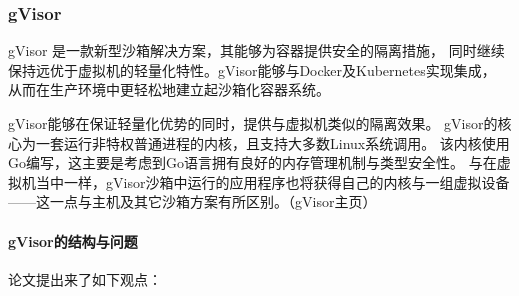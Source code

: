 \documentclass[AutoFakeBold,a4paper]{ctexart}
\begin{document}
\subsubsection{gVisor}
gVisor 是一款新型沙箱解决方案，其能够为容器提供安全的隔离措施，
同时继续保持远优于虚拟机的轻量化特性。gVisor能够与Docker及Kubernetes实现集成，
从而在生产环境中更轻松地建立起沙箱化容器系统。

gVisor能够在保证轻量化优势的同时，提供与虚拟机类似的隔离效果。
gVisor的核心为一套运行非特权普通进程的内核，且支持大多数Linux系统调用。
该内核使用Go编写，这主要是考虑到Go语言拥有良好的内存管理机制与类型安全性。
与在虚拟机当中一样，gVisor沙箱中运行的应用程序也将获得自己的内核与一组虚拟设备
——这一点与主机及其它沙箱方案有所区别。（gVisor主页）

\paragraph{gVisor的结构与问题}

论文\cite{234857}提出来了如下观点：
\end{document}
